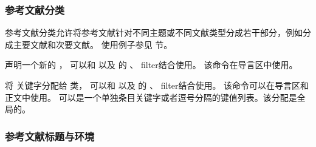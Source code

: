 \subsubsection{参考文献分类}%
\label{use:bib:cat}


参考文献分类允许将参考文献针对不同主题或不同文献类型分成若干部分，例如分成主要文献和次要文献。
使用例子参见  节。

\begin{ltxsyntax}



声明一个新的 ，
可以和  以及  的 、 filter结合使用。
该命令在导言区中使用。



将  关键字分配给  类，
可以和  以及  的 、 filter结合使用。
该命令可以在导言区和正文中使用。
 可以是一个单独条目关键字或者逗号分隔的键值列表。该分配是全局的。

\end{ltxsyntax}

\subsubsection{参考文献标题与环境}%
\label{use:bib:hdg}

